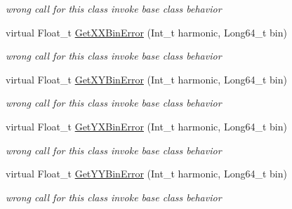 \begin{DoxyCompactItemize}
\begin{DoxyCompactList}\small\item\em wrong call for this class invoke base class behavior \end{DoxyCompactList}\item 
\mbox{\label{classQn_1_1CorrectionProfile3DCorrelations_a5b8a043e3d3377b4201c87085e12dd5b}} 
virtual Float\+\_\+t \mbox{\hyperlink{classQn_1_1CorrectionProfile3DCorrelations_a5b8a043e3d3377b4201c87085e12dd5b}{Get\+X\+X\+Bin\+Error}} (Int\+\_\+t harmonic, Long64\+\_\+t bin)
\begin{DoxyCompactList}\small\item\em wrong call for this class invoke base class behavior \end{DoxyCompactList}\item 
\mbox{\label{classQn_1_1CorrectionProfile3DCorrelations_a44be0e49b21d3e4528d65e0c7398ddd0}} 
virtual Float\+\_\+t \mbox{\hyperlink{classQn_1_1CorrectionProfile3DCorrelations_a44be0e49b21d3e4528d65e0c7398ddd0}{Get\+X\+Y\+Bin\+Error}} (Int\+\_\+t harmonic, Long64\+\_\+t bin)
\begin{DoxyCompactList}\small\item\em wrong call for this class invoke base class behavior \end{DoxyCompactList}\item 
\mbox{\label{classQn_1_1CorrectionProfile3DCorrelations_a3f6a74c4e11f5cf25e9e790f8bda20ba}} 
virtual Float\+\_\+t \mbox{\hyperlink{classQn_1_1CorrectionProfile3DCorrelations_a3f6a74c4e11f5cf25e9e790f8bda20ba}{Get\+Y\+X\+Bin\+Error}} (Int\+\_\+t harmonic, Long64\+\_\+t bin)
\begin{DoxyCompactList}\small\item\em wrong call for this class invoke base class behavior \end{DoxyCompactList}\item 
\mbox{\label{classQn_1_1CorrectionProfile3DCorrelations_a114a4f0454ad223929c3a16504c408aa}} 
virtual Float\+\_\+t \mbox{\hyperlink{classQn_1_1CorrectionProfile3DCorrelations_a114a4f0454ad223929c3a16504c408aa}{Get\+Y\+Y\+Bin\+Error}} (Int\+\_\+t harmonic, Long64\+\_\+t bin)
\begin{DoxyCompactList}\small\item\em wrong call for this class invoke base class behavior \end{DoxyCompactList}\item 

\end{DoxyCompactItemize}
